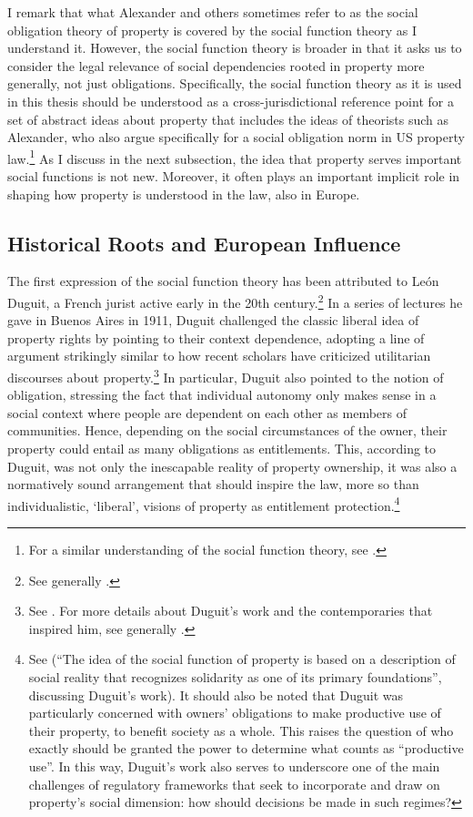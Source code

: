 I remark that what Alexander and others sometimes refer to as the social obligation theory of property is covered by the social function theory as I understand it. However, the social function theory is broader in that it asks us to consider the legal relevance of social dependencies rooted in property more generally, not just obligations. Specifically, the social function theory as it is used in this thesis should be understood as a cross-jurisdictional reference point for a set of abstract ideas about property that includes the ideas of theorists such as Alexander, who also argue specifically for a social obligation norm in US property law.\footnote{For a similar understanding of the social function theory, see \cite{foster11}.} As I discuss in the next subsection, the idea that property serves important social functions is not new. Moreover, it often plays an important implicit role in shaping how property is understood in the law, also in Europe.

\subsection{Historical Roots and European Influence}

The first expression of the social function theory has been attributed to Le{\'o}n Duguit, a French jurist active early in the 20th century.\footnote{See generally \cite{foster11}.} In a series of lectures he gave in Buenos Aires in 1911, Duguit challenged the classic liberal idea of property rights by pointing to their context dependence, adopting a line of argument strikingly similar to how recent scholars have criticized utilitarian discourses about property.\footnote{See \cite[1004-1008]{foster11}. For more details about Duguit's work and the contemporaries that inspired him, see generally \cite{mirow10}.} In particular, Duguit also pointed to the notion of obligation, stressing the fact that individual autonomy only makes sense in a social context where people are dependent on each other as members of  communities. Hence, depending on the social circumstances of the owner, their property could entail as many obligations as entitlements. This, according to Duguit, was not only the inescapable reality of property ownership, it was also a normatively sound arrangement that should inspire the law, more so than individualistic, `liberal', visions of property as entitlement protection.\footnote{See \cite[1005]{foster11} (``The idea of the social function of property is based on a description of social reality that recognizes solidarity as one of its primary foundations'', discussing Duguit's work). It should also be noted that Duguit was particularly concerned with owners' obligations to make productive use of their property, to benefit society as a whole. This raises the question of who exactly should be granted the power to determine what counts as ``productive use''. In this way, Duguit's work also serves to underscore one of the main challenges of regulatory frameworks that seek to incorporate and draw on property's social dimension: how should decisions be made in such regimes?}

